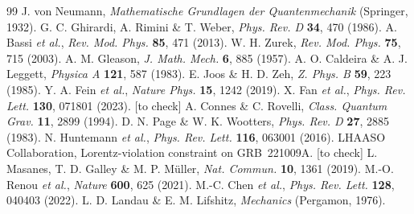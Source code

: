 \documentclass[11pt,a4paper]{article}
\newcommand{\statut}[1]{{\footnotesize\textsf{[#1]}}}
\theoremstyle{plain}
\theoremstyle{definition}
\theoremstyle{remark}
\begin{document}
\begin{thebibliography}{99}
 J. von Neumann, \textit{Mathematische Grundlagen der Quantenmechanik} (Springer, 1932).
 G. C. Ghirardi, A. Rimini \& T. Weber, \textit{Phys. Rev. D} \textbf{34}, 470 (1986).
 A. Bassi \textit{et al.}, \textit{Rev. Mod. Phys.} \textbf{85}, 471 (2013).
 W. H. Zurek, \textit{Rev. Mod. Phys.} \textbf{75}, 715 (2003).
 A. M. Gleason, \textit{J. Math. Mech.} \textbf{6}, 885 (1957).
 A. O. Caldeira \& A. J. Leggett, \textit{Physica A} \textbf{121}, 587 (1983).
 E. Joos \& H. D. Zeh, \textit{Z. Phys. B} \textbf{59}, 223 (1985).
 Y. A. Fein \textit{et al.}, \textit{Nature Phys.} \textbf{15}, 1242 (2019).
 X. Fan \textit{et al.}, \textit{Phys. Rev. Lett.} \textbf{130}, 071801 (2023). \statut{to check}
 A. Connes \& C. Rovelli, \textit{Class. Quantum Grav.} \textbf{11}, 2899 (1994).
 D. N. Page \& W. K. Wootters, \textit{Phys. Rev. D} \textbf{27}, 2885 (1983).
 N. Huntemann \textit{et al.}, \textit{Phys. Rev. Lett.} \textbf{116}, 063001 (2016).
 LHAASO Collaboration, Lorentz-violation constraint on GRB~221009A. \statut{to check}
 L. Masanes, T. D. Galley \& M. P. M\"uller, \textit{Nat. Commun.} \textbf{10}, 1361 (2019).
 M.-O. Renou \textit{et al.}, \textit{Nature} \textbf{600}, 625 (2021).
 M.-C. Chen \textit{et al.}, \textit{Phys. Rev. Lett.} \textbf{128}, 040403 (2022).
 L. D. Landau \& E. M. Lifshitz, \textit{Mechanics} (Pergamon, 1976).
\end{thebibliography}
\end{document}
